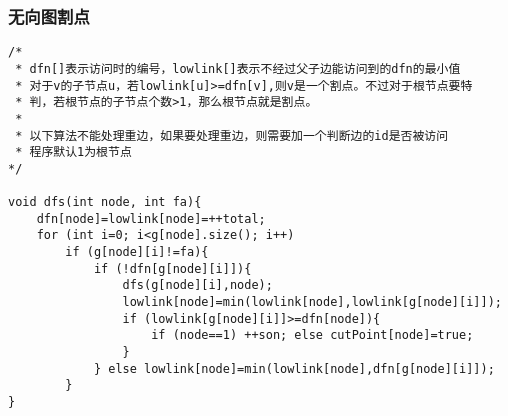 \subsubsection{无向图割点}
\begin{verbatim}
/*
 * dfn[]表示访问时的编号，lowlink[]表示不经过父子边能访问到的dfn的最小值
 * 对于v的子节点u，若lowlink[u]>=dfn[v],则v是一个割点。不过对于根节点要特
 * 判，若根节点的子节点个数>1，那么根节点就是割点。
 *
 * 以下算法不能处理重边，如果要处理重边，则需要加一个判断边的id是否被访问
 * 程序默认1为根节点
*/

void dfs(int node, int fa){
    dfn[node]=lowlink[node]=++total;
    for (int i=0; i<g[node].size(); i++)
        if (g[node][i]!=fa){
            if (!dfn[g[node][i]]){
                dfs(g[node][i],node);
                lowlink[node]=min(lowlink[node],lowlink[g[node][i]]);
                if (lowlink[g[node][i]]>=dfn[node]){
                    if (node==1) ++son; else cutPoint[node]=true;
                }
            } else lowlink[node]=min(lowlink[node],dfn[g[node][i]]);
        }
}
\end{verbatim}
